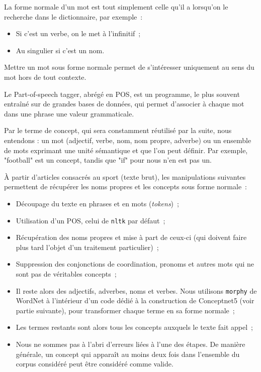 \documentclass[a4paper, 12pt]{article}
\newcommand{\pyt}[1]{\texttt{#1}}%
\begin{document}
\begin{definition}
La forme normale d'un mot est tout simplement celle qu'il a lorsqu'on le recherche dans le dictionnaire, par exemple~:
\begin{itemize}
 \item Si c'est un verbe, on le met à l'infinitif~;
 \item Au singulier si c'est un nom.
\end{itemize}
Mettre un mot sous forme normale permet de s'intéresser uniquement au sens du mot hors de tout contexte.
\end{definition}


\begin{definition}
Le Part-of-speech tagger, abrégé en POS, est un programme, le plus souvent entraîné sur de grandes bases de données, qui permet d'associer à chaque mot dans une phrase une valeur grammaticale.
\end{definition}

\begin{definition}[Concept]
Par le terme de concept, qui sera constamment réutilisé par la suite, nous entendons : un mot (adjectif, verbe, nom, nom propre, adverbe) ou un ensemble de mots exprimant une unité sémantique et que l'on peut définir. Par exemple, "football" est un concept, tandis que "if" pour nous n'en est pas un.
\end{definition}

\`A partir d'articles consacrés au sport (texte brut), les manipulations suivantes permettent de récupérer les noms propres et les concepts sous forme normale~:
\begin{itemize}
 \item Découpage du texte en phrases et en mots (\textit{tokens})~;
 \item Utilisation d'un POS, celui de \pyt{nltk} par défaut~;
 \item Récupération des noms propres et mise à part de ceux-ci (qui doivent faire plus tard l'objet d'un traitement particulier)~;
 \item Suppression des conjonctions de coordination, pronoms et autres mots qui ne sont pas de véritables concepts~;
 \item Il reste alors des adjectifs, adverbes, noms et verbes. Nous utilisons \pyt{morphy} de WordNet à l'intérieur d'un code dédié à la construction de Conceptnet5 (voir partie suivante), pour transformer chaque terme en sa forme normale~;
 \item Les termes restants sont alors tous les concepts auxquels le texte fait appel~;
 \item Nous ne sommes pas à l'abri d'erreurs liées à l'une des étapes. De manière générale, un concept qui apparaît au moins deux fois dans l'ensemble du corpus considéré peut être considéré comme valide.
\end{itemize}
\end{document}
